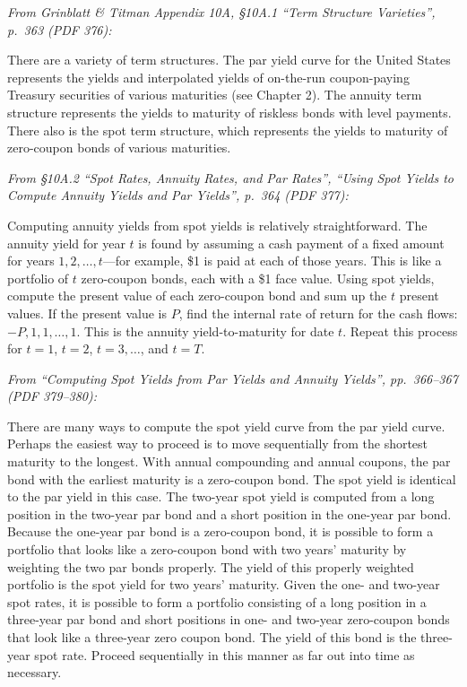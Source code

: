 \documentclass[11pt,a4paper]{article}
\begin{document}
\emph{From Grinblatt \& Titman Appendix 10A, §10A.1 ``Term Structure Varieties'', p.~363 (PDF 376):}

There are a variety of term structures. The par yield curve for the United States represents the
yields and interpolated yields of on-the-run coupon-paying Treasury securities of various maturities
(see Chapter 2). The annuity term structure represents the yields to maturity of riskless bonds with
level payments. There also is the spot term structure, which represents the yields to maturity of
zero-coupon bonds of various maturities.

\emph{From §10A.2 ``Spot Rates, Annuity Rates, and Par Rates'', ``Using Spot Yields to Compute
Annuity Yields and Par Yields'', p.~364 (PDF 377):}

Computing annuity yields from spot yields is relatively straightforward. The annuity yield for year
\(t\) is found by assuming a cash payment of a fixed amount for years \(1, 2, \ldots, t\)---for
example, \$1 is paid at each of those years. This is like a portfolio of \(t\) zero-coupon bonds,
each with a \$1 face value. Using spot yields, compute the present value of each zero-coupon bond
and sum up the \(t\) present values. If the present value is \(P\), find the internal rate of return
for the cash flows: \(-P, 1, 1, \ldots, 1\). This is the annuity yield-to-maturity for date \(t\).
Repeat this process for \(t = 1\), \(t = 2\), \(t = 3, \ldots\), and \(t = T\).

\emph{From ``Computing Spot Yields from Par Yields and Annuity Yields'', pp.~366--367 (PDF
379--380):}

There are many ways to compute the spot yield curve from the par yield curve. Perhaps the easiest
way to proceed is to move sequentially from the shortest maturity to the longest. With annual
compounding and annual coupons, the par bond with the earliest maturity is a zero-coupon bond. The
spot yield is identical to the par yield in this case. The two-year spot yield is computed from a
long position in the two-year par bond and a short position in the one-year par bond. Because the
one-year par bond is a zero-coupon bond, it is possible to form a portfolio that looks like a
zero-coupon bond with two years' maturity by weighting the two par bonds properly. The yield of this
properly weighted portfolio is the spot yield for two years' maturity. Given the one- and two-year
spot rates, it is possible to form a portfolio consisting of a long position in a three-year par
bond and short positions in one- and two-year zero-coupon bonds that look like a three-year zero
coupon bond. The yield of this bond is the three-year spot rate. Proceed sequentially in this manner
as far out into time as necessary.
\end{document}
